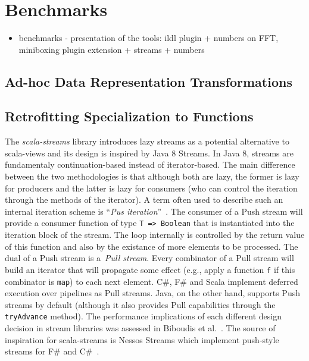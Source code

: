 \section{Benchmarks}
\label{sec:benchmarks}
\begin{itemize}
  \item benchmarks - presentation of the tools: ildl plugin + numbers on FFT, miniboxing plugin extension + streams + numbers
\end{itemize}

\subsection{Ad-hoc Data Representation Transformations}
\label{sec:benchmarks:ad-hoc}

\subsection{Retrofitting Specialization to Functions}

\label{sec:benchmarks:funcs}
The \emph{scala-streams} library introduces lazy streams as a potential
alternative to scala-views and its design is inspired by Java 8 Streams. In Java
8, streams are fundamentaly continuation-based instead of iterator-based. The
main difference between the two methodologies is that although both are lazy,
the former is lazy for producers and the latter is lazy for consumers (who can
control the iteration through the methods of the iterator). A term often used to
describe such an internal iteration scheme is ``\emph{Pus
  iteration}''~\cite{obsidian,defuncpush}.  The consumer of a Push stream will
provide a consumer function of type \verb|T => Boolean| that is instantiated
into the iteration block of the stream. The loop internally is controlled by the
return value of this function and also by the existance of more elements to be
processed. The dual of a Push stream is a~\emph{Pull stream}. Every combinator
of a Pull stream will build an iterator that will propagate some effect (e.g.,
apply a function \verb|f| if this combinator is \verb|map|) to each next
element. C\#, F\# and Scala implement deferred execution over pipelines as Pull
streams. Java, on the other hand, supports Push streams by default (although it
also provides Pull capabilities through the \verb|tryAdvance| method). The
performance implications of each different design decision in stream libraries
was assessed in Biboudis et al.~\cite{biboudis_clash_2014}. The source of
inspiration for scala-streams is Nessos Streams which implement push-style
streams for F\# and C\#~\cite{nessos_streams}.

